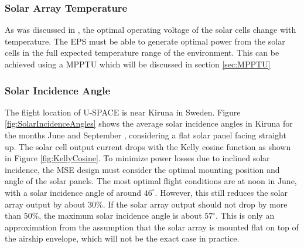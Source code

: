 \subsubsection*{Solar Array Temperature}
As was discussed in \cite{PDR}, the optimal operating voltage of the solar cells change with temperature. The \ac{EPS} must be able to generate optimal power from the solar cells in the full expected temperature range of the environment. This can be achieved using a \ac{MPPTU} which will be discussed in section \ref{sec:MPPTU}
%
\subsubsection*{Solar Incidence Angle}
The flight location of U-SPACE is near Kiruna in Sweden. Figure \ref{fig:SolarIncidenceAngles} shows the average solar incidence angles in Kiruna for the months June and September \cite{web:solarincidence}, considering a flat solar panel facing straight up.
The solar cell output current drops with the Kelly cosine function as shown in Figure \ref{fig:KellyCosine}. To minimize power losses due to inclined solar incidence, the \ac{MSE} design must consider the optimal mounting position and angle of the solar panels. The most optimal flight conditions are at noon in June, with a solar incidence angle of around $46^{\circ}$. However, this still reduces the solar array output by about $30\%$. If the solar array output should not drop by more than $50\%$, the maximum solar incidence angle is about $57^{\circ}$. This is only an approximation from the assumption that the solar array is mounted flat on top of the airship envelope, which will not be the exact case in practice.
%
